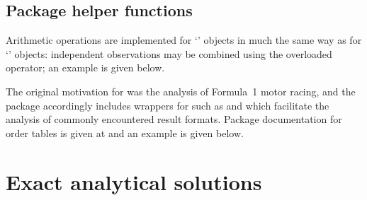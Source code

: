 \documentclass[article]{jss}
\begin{document}
\subsection{Package helper functions}

Arithmetic operations are implemented for `' objects in
much the same way as for `' objects: independent
observations may be combined using the overloaded \code{+} operator;
an example is given below.

The original motivation for  was the analysis of
Formula~1 motor racing, and the package accordingly includes wrappers for
 such as  and
 which facilitate the analysis of commonly
encountered result formats.  Package documentation for order tables is
given at  and an example is given below.

\section{Exact analytical solutions}
\end{document}
